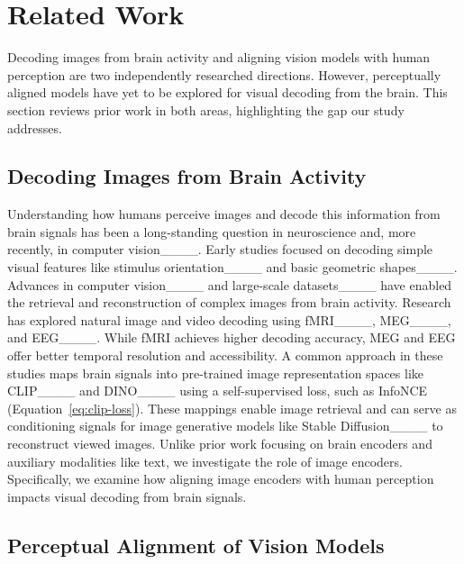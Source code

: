 \section{Related Work }
Decoding images from brain activity and aligning vision models with human perception are two independently researched directions. However, perceptually aligned models have yet to be explored for visual decoding from the brain. This section reviews prior work in both areas, highlighting the gap our study addresses.
\vspace{-5pt}
\subsection{Decoding Images from Brain Activity}

Understanding how humans perceive images and decode this information from brain signals has been a long-standing question in neuroscience and, more recently, in computer vision____. Early studies focused on decoding simple visual features like stimulus orientation____ and basic geometric shapes____. Advances in computer vision____ and large-scale datasets____ have enabled the retrieval and reconstruction of complex images from brain activity. Research has explored natural image and video decoding using fMRI____, MEG____, and EEG____. While fMRI achieves higher decoding accuracy, MEG and EEG offer better temporal resolution and accessibility. A common approach in these studies maps brain signals into pre-trained image representation spaces like CLIP____ and DINO____ using a self-supervised loss, such as InfoNCE (Equation~\ref{eq:clip-loss}). These mappings enable image retrieval and can serve as conditioning signals for image generative models like Stable Diffusion____ to reconstruct viewed images. Unlike prior work focusing on brain encoders and auxiliary modalities like text, we investigate the role of image encoders. Specifically, we examine how aligning image encoders with human perception impacts visual decoding from brain signals.
\vspace{-5pt}
\subsection{Perceptual Alignment of Vision Models}

